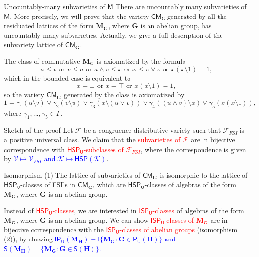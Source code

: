 \documentclass[professionalfont, 10pt]{beamer} %
\theoremstyle{plain}
\theoremstyle{definition}
\newcommand{\m}[1]{{\mathbf {#1} }}
\newcommand{\jn}{\vee}
\newcommand{\mt}{\wedge}
\newcommand{\ld}{{\setminus}}
\begin{document}
\begin{frame}{Uncountably-many subvarieties of $\mathsf{M}$}
There are uncountably many subvarieties of $\mathsf{M}$. \pause
More precisely, we will prove that the variety $\mathsf{CM_G}$ generated by all the residuated lattices of the form $\mathbf{M}_{\mathbf{G}}$, where $\mathbf{G}$ is an abelian group, has uncountably-many subvarieties.
Actually, we give a full description of the subvariety lattice of $\mathsf{CM}_{\mathbf{G}}$.
\pause

The class of commutative $\m M_{\m G}$ is axiomatized by the formula
$$u \leq v \text{ or } v \leq u \text{ or } u \mt v \leq x \text{ or } x \leq u \jn v \text{ or } x(x\ld 1) = 1,$$
which in the bounded case is equivalent to
$$x = \bot \text{ or } x = \top \text{ or } x(x\ld 1) = 1,$$
so the variety $\mathsf{CM}_{\m G}$ generated by the class is axiomatized by $$1 = \gamma_1(u \ld v) \jn \gamma_2(v \ld u) \jn \gamma_3(x \ld (u \jn v)) \jn \gamma_4((u \mt v) \ld x) \jn \gamma_5(x(x\ld 1)),$$
where $\gamma_1, \ldots, \gamma_5 \in \Gamma$.
\end{frame}

\begin{frame}{Sketch of the proof}
    Let $\mathcal{F}$ be a congruence-distributive variety such that $\mathcal{F}_{FSI}$ is a positive universal class.
    We claim that the \textcolor{red}{subvarieties of $\mathcal{F}$} are in bijective correspondence with \textcolor{red}{$\mathsf{HSP_U}$-subclasses of $\mathcal{F}_{FSI}$}, where the correspondence is given by 
    \textcolor{blue}{$\mathcal{V} \mapsto \mathcal{V}_{FSI}$ and $\mathcal{K} \mapsto \mathsf{HSP}(\mathcal{K})$}.\pause
    \begin{block}{Isomorphism (1)}
        The lattice of subvarieties of $\mathsf{CM}_{\mathbf{G}}$ is isomorphic to the lattice of  $\mathsf{HSP_U}$-classes of FSI's in $\mathsf{CM}_{\mathbf{G}}$, which are $\mathsf{HSP_U}$-classes of algebras of the form $\m{M}_{\m{G}}$, where $\m{G}$ is an abelian group.
    \end{block}
    \pause
    Instead of \textcolor{red}{$\mathsf{HSP_U}$-classes}, we are interested in \textcolor{red}{$\mathsf{ISP_U}$-classes} of algebras of the form $\m{M}_{\m{G}}$, where $\m{G}$ is an abelian group.\pause
    We can show \textcolor{red}{$\mathsf{ISP_U}$-classes of $\m M_{\m G}$} are in bijective correspondence with the \textcolor{red}{$\mathsf{ISP_U}$-classes of abelian groups} (isomorphism (2)), by showing \textcolor{blue}{$\mathsf{IP_U}(\m{M}_{\m{H}})=\mathsf{I}\{\m{M}_{\m{G}}: \m{G} \in \mathsf{P_U}(\m{H})\}$ and $\mathsf{S}(\m{M}_{\m{H}})=\{\m{M}_{\m{G}}:  \m{G} \in \mathsf{S}(\m{H})\}$.}
\end{frame}
\end{document}
